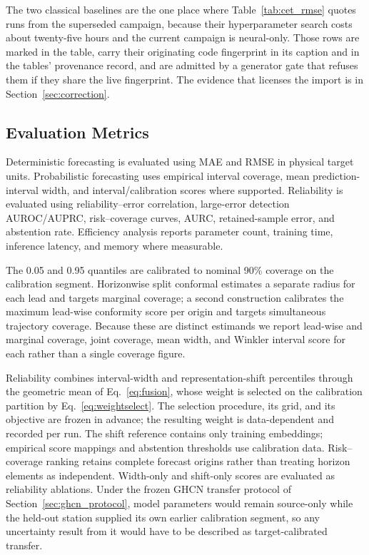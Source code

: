 The two classical baselines are the one place where Table~\ref{tab:cet_rmse} quotes runs from the superseded campaign, because their hyperparameter search costs about twenty-five hours and the current campaign is neural-only. Those rows are marked in the table, carry their originating code fingerprint in its caption and in the tables' provenance record, and are admitted by a generator gate that refuses them if they share the live fingerprint. The evidence that licenses the import is in Section~\ref{sec:correction}.

\subsection{Evaluation Metrics}
Deterministic forecasting is evaluated using MAE and RMSE in physical target units. Probabilistic forecasting uses empirical interval coverage, mean prediction-interval width, and interval/calibration scores where supported. Reliability is evaluated using reliability--error correlation, large-error detection AUROC/AUPRC, risk--coverage curves, AURC, retained-sample error, and abstention rate. Efficiency analysis reports parameter count, training time, inference latency, and memory where measurable.

The 0.05 and 0.95 \method{} quantiles are calibrated to nominal 90\% coverage on the calibration segment. Horizonwise split conformal estimates a separate radius for each lead and targets marginal coverage; a second construction calibrates the maximum lead-wise conformity score per origin and targets simultaneous trajectory coverage. Because these are distinct estimands we report lead-wise and marginal coverage, joint coverage, mean width, and Winkler interval score for each rather than a single coverage figure.

Reliability combines interval-width and representation-shift percentiles through the geometric mean of Eq.~\eqref{eq:fusion}, whose weight is selected on the calibration partition by Eq.~\eqref{eq:weightselect}. The selection procedure, its grid, and its objective are frozen in advance; the resulting weight is data-dependent and recorded per run. The shift reference contains only training embeddings; empirical score mappings and abstention thresholds use calibration data. Risk--coverage ranking retains complete forecast origins rather than treating horizon elements as independent. Width-only and shift-only scores are evaluated as reliability ablations. Under the frozen GHCN transfer protocol of Section~\ref{sec:ghcn_protocol}, model parameters would remain source-only while the held-out station supplied its own earlier calibration segment, so any uncertainty result from it would have to be described as target-calibrated transfer.

